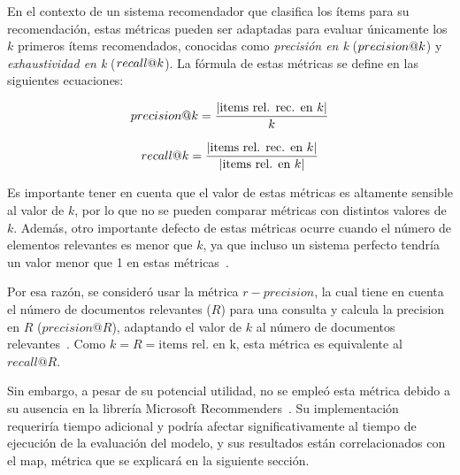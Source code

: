 En el contexto de un sistema recomendador que clasifica los ítems para su recomendación, estas métricas pueden ser adaptadas para evaluar únicamente los $k$ primeros ítems recomendados, conocidas como \textit{precisión en k} ($precision@k$) y \textit{exhaustividad en k} ($recall@k$). La fórmula de estas métricas se define en las siguientes ecuaciones:

\begin{minipage}{.5\textwidth}
    \begin{equation}\label{eq:precision_at_k}
        precision@k = \frac{|\text{items rel. rec. en $k$}|}{k}
    \end{equation}
\end{minipage}\begin{minipage}{.5\textwidth}
    \begin{equation}\label{eq:recall_at_k}
        recall@k = \frac{|\text{items rel. rec. en $k$}|}{|\text{items rel. en $k$}|}
    \end{equation}
\end{minipage}

Es importante tener en cuenta que el valor de estas métricas es altamente sensible al valor de $k$, por lo que no se pueden comparar métricas con distintos valores de $k$. Además, otro importante defecto de estas métricas ocurre cuando el número de elementos relevantes es menor que $k$, ya que incluso un sistema perfecto tendría un valor menor que 1 en estas métricas~\cite{manning_chapter_2008}.

Por esa razón, se consideró usar la métrica $r-precision$, la cual tiene en cuenta el número de documentos relevantes ($R$) para una consulta y calcula la precision en $R$ ($precision@R$), adaptando el valor de $k$ al número de documentos relevantes~\cite{manning_chapter_2008}. Como $k=R=\text{items rel. en k}$, esta métrica es equivalente al $recall@R$.

Sin embargo, a pesar de su potencial utilidad, no se empleó esta métrica debido a su ausencia en la librería Microsoft Recommenders~\cite{argyriou_microsoft_2020}. Su implementación requeriría tiempo adicional y podría afectar significativamente al tiempo de ejecución de la evaluación del modelo, y sus resultados están correlacionados con el \acrshort{map}, métrica que se explicará en la siguiente sección.


